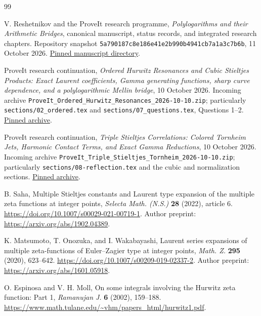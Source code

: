 \documentclass[11pt,a4paper]{article}
\numberwithin{equation}{section}
\theoremstyle{definition}
\theoremstyle{remark}
\newcommand{\src}[1]{\nolinkurl{#1}}
\begin{document}
\begin{thebibliography}{99}

V. Reshetnikov and the ProveIt research programme,
\emph{Polylogarithms and their Arithmetic Bridges}, canonical manuscript,
status records, and integrated research chapters. Repository snapshot
\texttt{5a790187c8e186e41e2b990b4941cb7a1a3c7b6b}, 11 October 2026.
\href{https://github.com/VladimirReshetnikov/ProveIt/tree/5a790187c8e186e41e2b990b4941cb7a1a3c7b6b/Analysis/Polylogarithms/docs/manuscript}{Pinned manuscript directory}.

ProveIt research continuation,
\emph{Ordered Hurwitz Resonances and Cubic Stieltjes Products:
Exact Laurent coefficients, Gamma generating functions, sharp curve
dependence, and a polylogarithmic Mellin bridge}, 10 October 2026.
Incoming archive \src{ProveIt_Ordered_Hurwitz_Resonances_2026-10-10.zip};
particularly \src{sections/02_ordered.tex} and
\src{sections/07_questions.tex}, Questions 1--2.
\href{https://github.com/VladimirReshetnikov/ProveIt/blob/5a790187c8e186e41e2b990b4941cb7a1a3c7b6b/docs/incoming/ProveIt_Ordered_Hurwitz_Resonances_2026-10-10.zip}{Pinned archive}.

ProveIt research continuation,
\emph{Triple Stieltjes Correlations: Colored Tornheim Jets, Harmonic
Contact Terms, and Exact Gamma Reductions}, 10 October 2026.
Incoming archive \src{ProveIt_Triple_Stieltjes_Tornheim_2026-10-10.zip};
particularly \src{sections/08-reflection.tex} and the cubic and
normalization sections.
\href{https://github.com/VladimirReshetnikov/ProveIt/blob/5a790187c8e186e41e2b990b4941cb7a1a3c7b6b/docs/incoming/ProveIt_Triple_Stieltjes_Tornheim_2026-10-10.zip}{Pinned archive}.

B. Saha, Multiple Stieltjes constants and Laurent type expansion of the
multiple zeta functions at integer points,
\emph{Selecta Math. (N.S.)} \textbf{28} (2022), article 6.
\url{https://doi.org/10.1007/s00029-021-00719-1}.
Author preprint: \url{https://arxiv.org/abs/1902.04389}.

K. Matsumoto, T. Onozuka, and I. Wakabayashi,
Laurent series expansions of multiple zeta-functions of Euler--Zagier
type at integer points, \emph{Math. Z.} \textbf{295} (2020), 623--642.
\url{https://doi.org/10.1007/s00209-019-02337-2}.
Author preprint: \url{https://arxiv.org/abs/1601.05918}.

O. Espinosa and V. H. Moll,
On some integrals involving the Hurwitz zeta function: Part 1,
\emph{Ramanujan J.} \textbf{6} (2002), 159--188.
\url{https://www.math.tulane.edu/~vhm/papers_html/hurwitz1.pdf}.


\end{thebibliography}
\end{document}

